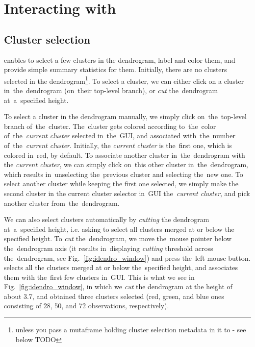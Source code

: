 \documentclass[article]{jss}
\newcommand{\myemph}[1]{\emph{#1}}
\newcommand{\Rfunction}[1]{\code{#1}}
\begin{document}
\section[Interacting with idendro]{Interacting with \Rfunction{idendro}}

\subsection{Cluster selection}

\Rfunction{idendro} enables to select a few clusters in the
dendrogram, label and color them, and provide simple summary statistics
for them. Initially, there are no clusters selected in the
dendrogram\footnote{unless you pass a mutaframe holding cluster
selection metadata in it to \Rfunction{idendro} - see below TODO}.  
To select a cluster, we can either click on a cluster
in~the~dendrogram (on~their top-level branch), or \myemph{cut}
the~dendrogram at~a~specified height.

To select a cluster in the dendrogram manually, we simply click
on~the~top-level branch of~the~cluster. The~cluster gets colored
according to~the~color of~the~\myemph{current cluster} selected
in~the~GUI, and associated with~the~number of~the~\myemph{current
cluster}.  
Initially, the \myemph{current cluster} is the~first one, which is
colored in~red, by default. 
To associate another cluster in~the~dendrogram with the \myemph{current
cluster}, we can simply click on~this other cluster in~the~dendrogram,
which results in~unselecting the~previous cluster and selecting the~new
one. 
To select another cluster while keeping the first one selected, we
simply make the second cluster in the current cluster selector in~GUI
the~\myemph{current cluster}, and pick another cluster
from~the~dendrogram.   

We can also select clusters automatically by \myemph{cutting} the
dendrogram at~a~specified height, i.e. asking \Rfunction{idendro} to
select all clusters merged at or below the specified height. 
To \myemph{cut} the~dendrogram, we move the~mouse pointer below
the~dendrogram axis (it results in~displaying \myemph{cutting}
threshold across the~dendrogram, see Fig.~\ref{fig:idendro_window}) and
press the~left mouse button.  
\Rfunction{idendro} selects all the clusters merged at or below
the~specified height, and associates them with the~first few clusters
in~GUI. 
This is what we see in Fig.~\ref{fig:idendro_window}, in which we
\myemph{cut}
the dendrogram at the height of about 3.7, and obtained three clusters
selected (red, green, and blue ones consisting of 28, 50, and 72
observations, respectively). 
\end{document}
